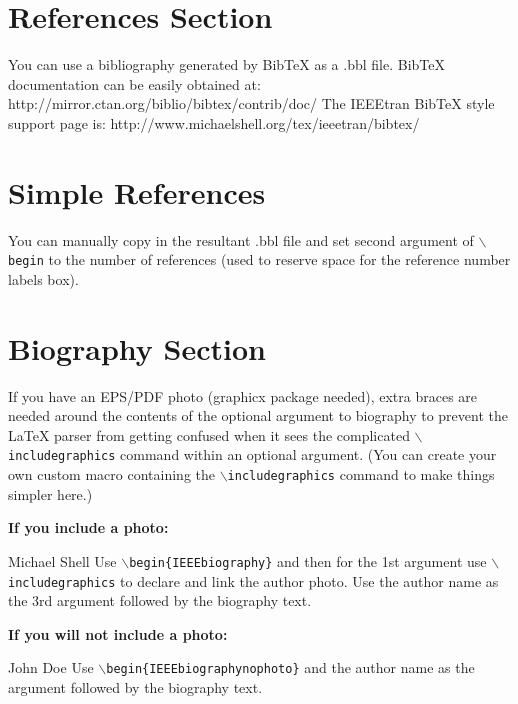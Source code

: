 \documentclass[lettersize,journal]{IEEEtran}
\begin{document}
\section{References Section}
You can use a bibliography generated by BibTeX as a .bbl file.
 BibTeX documentation can be easily obtained at:
 http://mirror.ctan.org/biblio/bibtex/contrib/doc/
 The IEEEtran BibTeX style support page is:
 http://www.michaelshell.org/tex/ieeetran/bibtex/
 
%
%
\section{Simple References}
You can manually copy in the resultant .bbl file and set second argument of $\backslash${\tt{begin}} to the number of references
 (used to reserve space for the reference number labels box).





\newpage

\section{Biography Section}
If you have an EPS/PDF photo (graphicx package needed), extra braces are
 needed around the contents of the optional argument to biography to prevent
 the LaTeX parser from getting confused when it sees the complicated
 $\backslash${\tt{includegraphics}} command within an optional argument. (You can create
 your own custom macro containing the $\backslash${\tt{includegraphics}} command to make things
 simpler here.)
 
\vspace{11pt}

\bf{If you include a photo:}\vspace{-33pt}
\begin{IEEEbiography}{Michael Shell}
Use $\backslash${\tt{begin\{IEEEbiography\}}} and then for the 1st argument use $\backslash${\tt{includegraphics}} to declare and link the author photo.
Use the author name as the 3rd argument followed by the biography text.
\end{IEEEbiography}

\vspace{11pt}

\bf{If you will not include a photo:}\vspace{-33pt}
\begin{IEEEbiographynophoto}{John Doe}
Use $\backslash${\tt{begin\{IEEEbiographynophoto\}}} and the author name as the argument followed by the biography text.
\end{IEEEbiographynophoto}




\vfill
\end{document}
